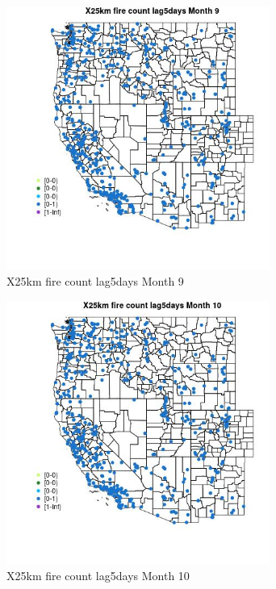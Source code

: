 \begin{figure} 
\centering  
\includegraphics[width=0.77\textwidth]{Code_Outputs/Report_ML_input_PM25_Step4_part_e_de_duplicated_aves_compiled_2019-05-14wNAs_MapObsMo9X25km_fire_count_lag5days.jpg} 
\caption{\label{fig:Report_ML_input_PM25_Step4_part_e_de_duplicated_aves_compiled_2019-05-14wNAsMapObsMo9X25km_fire_count_lag5days}X25km fire count lag5days Month 9} 
\end{figure} 
 

\begin{figure} 
\centering  
\includegraphics[width=0.77\textwidth]{Code_Outputs/Report_ML_input_PM25_Step4_part_e_de_duplicated_aves_compiled_2019-05-14wNAs_MapObsMo10X25km_fire_count_lag5days.jpg} 
\caption{\label{fig:Report_ML_input_PM25_Step4_part_e_de_duplicated_aves_compiled_2019-05-14wNAsMapObsMo10X25km_fire_count_lag5days}X25km fire count lag5days Month 10} 
\end{figure} 
 

